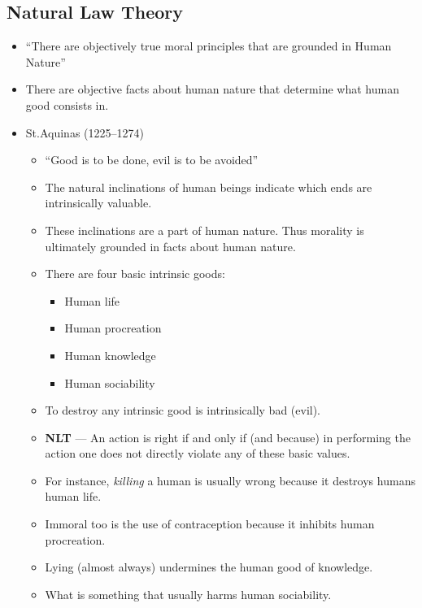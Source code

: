 \documentclass{article}
\begin{document}
    \begin{spacing}{1.2}
        \newpage
        \section{Natural Law Theory}
        \begin{itemize}
            \item ``There are objectively true moral principles that are grounded in Human Nature''
            \item There are objective facts about human nature that determine what human good consists in.
            \item St.\@Thomas Aquinas (1225--1274)
            \begin{itemize}
                \item ``Good is to be done, evil is to be avoided''
                \item The natural inclinations of human beings indicate which ends are intrinsically valuable.
                \item These inclinations are a part of human nature. Thus morality is ultimately grounded in facts about human nature.
                \item There are four basic intrinsic goods:
                \begin{itemize}
                    \item Human life
                    \item Human procreation
                    \item Human knowledge
                    \item Human sociability
                \end{itemize}
                \item To destroy any intrinsic good is intrinsically bad (evil).
                \item \textbf{NLT} --- An action is right if and only if (and because) in performing the action one does not directly violate any of these basic values.
                \item For instance, \emph{killing} a human is usually wrong because it destroys humans human life.
                \item Immoral too is the use of contraception because it inhibits human procreation.
                \item Lying (almost always) undermines the human good of knowledge.
                \item What is something that usually harms human sociability.

\end{itemize}
\end{itemize}
\end{spacing}
\end{document}
